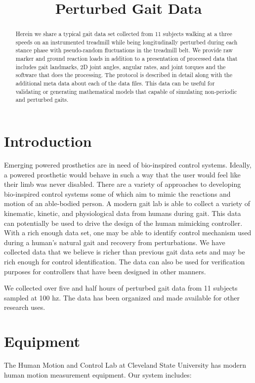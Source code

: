 \documentclass{article}
\title{Perturbed Gait Data}
\begin{document}
\begin{abstract}

  Herein we share a typical gait data set collected from 11 subjects walking at
  a three speeds on an instrumented treadmill while being longitudinally
  perturbed during each stance phase with pseudo-random fluctuations in the
  treadmill belt. We provide raw marker and ground reaction loads in addition
  to a presentation of processed data that includes gait landmarks, 2D joint
  angles, angular rates, and joint torques and the software that does the
  processing. The protocol is described in detail along with the additional
  meta data about each of the data files. This data can be useful for
  validating or generating mathematical models that capable of simulating
  non-periodic and perturbed gaits.

\end{abstract}

\section{Introduction}
%
Emerging powered prosthetics are in need of bio-inspired control systems.
Ideally, a powered prosthetic would behave in such a way that the user would
feel like their limb was never disabled. There are a variety of approaches to
developing bio-inspired control systems some of which aim to mimic the
reactions and motion of an able-bodied person. A modern gait lab is able to
collect a variety of kinematic, kinetic, and physiological data from humans
during gait. This data can potentially be used to drive the design of the human
mimicking controller. With a rich enough data set, one may be able to identify
control mechanism used during a human's natural gait and recovery from
perturbations. We have collected data that we believe is richer than previous
gait data sets and may be rich enough for control identification. The data can
also be used for verification purposes for controllers that have been designed
in other manners.

We collected over five and half hours of perturbed gait data from 11 subjects
sampled at 100 hz. The data has been organized and made available for other
research uses.

\section{Equipment}
%
The Human Motion and Control Lab at Cleveland State University has modern human
motion measurement equipment. Our system includes:
\end{document}
